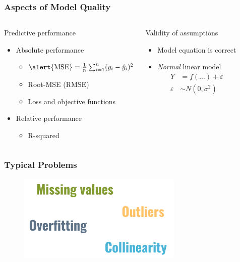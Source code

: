 \documentclass[
    utf8,
    aspectratio=169
]{beamer}  %
\begin{document}
\begin{frame}
\frametitle{Aspects of Model Quality}
\begin{columns}[onlytextwidth]
	\begin{block}{Predictive performance}
		\begin{itemize}
			\item Absolute performance
				\begin{itemize}
					\item $\text{\alert{MSE}} = \frac{1}{n}\sum_{i = 1}^n (y_i - \hat y_i)^2$
					\item Root-MSE (\alert{RMSE})
					\item Loss and objective functions	
				\end{itemize}
			\item Relative performance
				\begin{itemize}
					\item \alert{R-squared}
				\end{itemize}
		\end{itemize}
	\end{block}	

	\begin{block}{Validity of assumptions}
		\begin{itemize}
			\item Model equation is correct
			\item {\em Normal} linear model
			 \begin{align*}
				 Y &= f(\dots) + \varepsilon \\
				 \varepsilon &\sim N(0, \sigma^2)
			 \end{align*}
		\end{itemize}
	\end{block}
\end{columns}
\begin{center}
	\begin{example}
	\end{example}
\end{center}
\end{frame}

\begin{frame}
\frametitle{Typical Problems}
\begin{figure}
	\includegraphics[width=0.7\textwidth]{pics/linear_problems.png}
\end{figure}
\end{frame}
\end{document}
